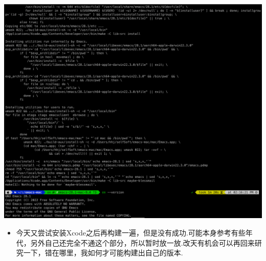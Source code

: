 \documentclass[9pt, b5paper]{article}
\begin{document}
\begin{center}
\includegraphics[width=.9\linewidth]{./pic/readme_20230208_142554.png}
\end{center}
\begin{itemize}
\item 今天又尝试安装Xcode之后再构建一遍，但是没有成功.可能本身参考有些年代，另外自己还完全不通这个部分，所以暂时放一放.改天有机会可以再回来研究一下，错在哪里，我如何才可能构建出自己的版本.
\end{itemize}
\end{document}
